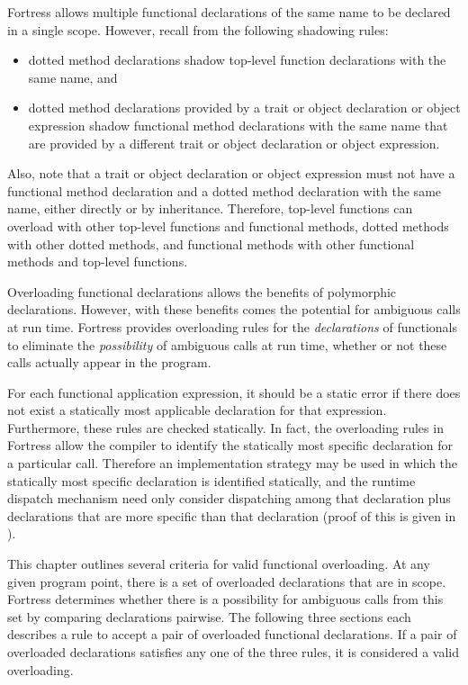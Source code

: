 Fortress allows multiple functional declarations of the same name to
be declared in a single scope.  However, recall from 
the following shadowing rules:
\begin{itemize}
\item
dotted method declarations shadow top-level function declarations with
the same name, and
\item
dotted method declarations provided by a trait or object declaration
or object expression
shadow functional method declarations with the same name that are
provided by a different trait or object declaration
or object expression.
\end{itemize}
Also, note that a trait or object declaration
or object expression must not have a
functional method declaration and a dotted method declaration with the
same name, either directly or by inheritance.
Therefore, top-level functions can overload
with other top-level functions and functional methods, dotted methods with
other dotted methods, and functional methods with other functional methods
and top-level functions.

Overloading functional declarations allows the benefits of polymorphic
declarations.  However, with these benefits comes the potential for
ambiguous calls at run time.  Fortress provides overloading rules for the
\emph{declarations} of functionals to eliminate the \emph{possibility}
of ambiguous calls at run time, whether or not these calls actually
appear in the program.

For each functional application expression, it should be a static error
if there does not exist a statically most applicable declaration for
that expression.
Furthermore, these rules are checked statically.
In fact, the overloading rules
in Fortress allow the compiler to identify the
statically most specific declaration for a particular call.  Therefore
an implementation strategy may be used in which the statically most
specific declaration is identified statically, and the runtime
dispatch mechanism need only consider dispatching among that
declaration plus declarations that are more specific than that
declaration (proof of this is given in ).

This chapter outlines several criteria for valid functional
overloading.  At any given program point, there is a set of overloaded
declarations that are in scope.  Fortress determines whether there is
a possibility for ambiguous calls from this set by comparing
declarations pairwise.  The following three sections each describes a
rule to accept a pair of overloaded functional declarations.  If a
pair of overloaded declarations satisfies any one of the three rules,
it is considered a valid overloading.


